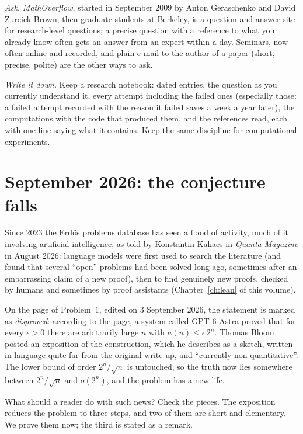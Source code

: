 \emph{Ask.} \emph{MathOverflow}, started in September 2009 by Anton Geraschenko and David Zureick-Brown, then graduate students at Berkeley, is a
question-and-answer site for research-level questions; a precise question with a reference to what you already know often gets an answer
from an expert within a day. Seminars, now often online and recorded, and plain e-mail to the author of a paper (short, precise, polite)
are the other ways to ask.

\emph{Write it down.} Keep a research notebook: dated entries, the question as you currently understand it, every attempt including the failed
ones (especially those: a failed attempt recorded with the reason it failed saves a week a year later), the computations with the code that
produced them, and the references read, each with one line saying what it contains. Keep the same discipline for computational experiments.

\section{September 2026: the conjecture falls}\label{sec:astra}

Since 2023 the Erd\H os problems database has seen a flood of activity, much of it involving artificial intelligence, as told by
Konstantin Kakaes in \emph{Quanta Magazine} in August 2026: language models were first used to search the literature (and found that several
``open'' problems had been solved long ago, sometimes after an embarrassing claim of a new proof), then to find genuinely new proofs, checked by
humans and sometimes by proof assistants (Chapter~\ref{ch:lean} of this volume).

On the page of Problem~$1$, edited on 3 September 2026, the statement is marked as \emph{disproved}: according to the page, a system called GPT-6
Astra proved that for every $\epsilon>0$ there are arbitrarily large $n$ with $a(n)\le\epsilon\,2^n$. Thomas Bloom posted an exposition of the
construction, which he describes as a sketch, written in language quite far from the original write-up, and ``currently non-quantitative''. The
lower bound of order $2^n/\sqrt n$ is untouched, so the truth now lies somewhere between $2^n/\sqrt n$ and $o(2^n)$, and the problem has a new life.

What should a reader do with such news? Check the pieces. The exposition reduces the problem to three steps, and two of them are short
and elementary. We prove them now; the third is stated as a remark.

